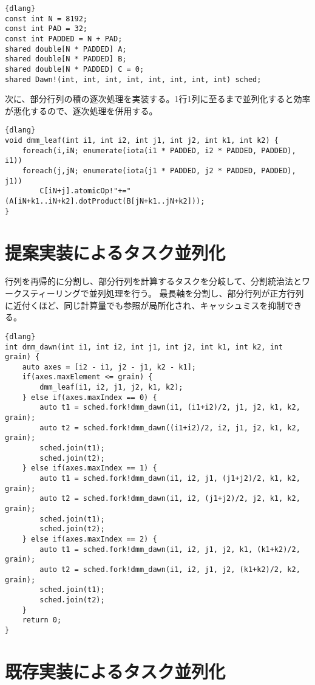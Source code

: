 \documentclass[10pt,a4paper]{book}
\begin{document}
\begin{Verbatim}{dlang}
const int N = 8192;
const int PAD = 32;
const int PADDED = N + PAD;
shared double[N * PADDED] A;
shared double[N * PADDED] B;
shared double[N * PADDED] C = 0;
shared Dawn!(int, int, int, int, int, int, int, int) sched;
\end{Verbatim}

次に、部分行列の積の逐次処理を実装する。1行1列に至るまで並列化すると効率が悪化するので、逐次処理を併用する。

\begin{Verbatim}{dlang}
void dmm_leaf(int i1, int i2, int j1, int j2, int k1, int k2) {
	foreach(i,iN; enumerate(iota(i1 * PADDED, i2 * PADDED, PADDED), i1))
	foreach(j,jN; enumerate(iota(j1 * PADDED, j2 * PADDED, PADDED), j1))
		C[iN+j].atomicOp!"+="(A[iN+k1..iN+k2].dotProduct(B[jN+k1..jN+k2]));
}
\end{Verbatim}

\section{提案実装によるタスク並列化\label{sect:dmm:dawn}}

行列を再帰的に分割し、部分行列を計算するタスクを分岐して、分割統治法とワークスティーリングで並列処理を行う。
最長軸を分割し、部分行列が正方行列に近付くほど、同じ計算量でも参照が局所化され、キャッシュミスを抑制できる。

\begin{Verbatim}{dlang}
int dmm_dawn(int i1, int i2, int j1, int j2, int k1, int k2, int grain) {
	auto axes = [i2 - i1, j2 - j1, k2 - k1];
	if(axes.maxElement <= grain) {
		dmm_leaf(i1, i2, j1, j2, k1, k2);
	} else if(axes.maxIndex == 0) {
		auto t1 = sched.fork!dmm_dawn(i1, (i1+i2)/2, j1, j2, k1, k2, grain);
		auto t2 = sched.fork!dmm_dawn((i1+i2)/2, i2, j1, j2, k1, k2, grain);
		sched.join(t1);
		sched.join(t2);
	} else if(axes.maxIndex == 1) {
		auto t1 = sched.fork!dmm_dawn(i1, i2, j1, (j1+j2)/2, k1, k2, grain);
		auto t2 = sched.fork!dmm_dawn(i1, i2, (j1+j2)/2, j2, k1, k2, grain);
		sched.join(t1);
		sched.join(t2);
	} else if(axes.maxIndex == 2) {
		auto t1 = sched.fork!dmm_dawn(i1, i2, j1, j2, k1, (k1+k2)/2, grain);
		auto t2 = sched.fork!dmm_dawn(i1, i2, j1, j2, (k1+k2)/2, k2, grain);
		sched.join(t1);
		sched.join(t2);
	}
	return 0;
}
\end{Verbatim}

\section{既存実装によるタスク並列化}
\end{document}

